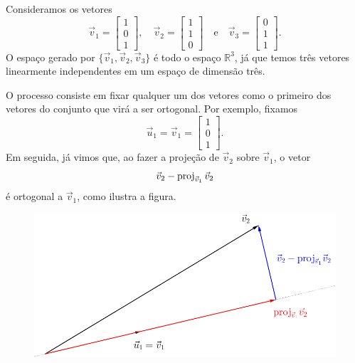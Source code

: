 \begin{ex}
Consideramos os vetores
\begin{equation}
\vec{v}_1 =
\begin{bmatrix}
1 \\ 0 \\ 1
\end{bmatrix}, \quad
\vec{v}_2 =
\begin{bmatrix}
1 \\ 1 \\ 0
\end{bmatrix} \quad \text{e} \quad
\vec{v}_3 =
\begin{bmatrix}
0 \\ 1 \\ 1
\end{bmatrix}.
\end{equation} O espaço gerado por $\{\vec{v}_1, \vec{v}_2, \vec{v}_3 \}$ é todo o espaço $\mathbb{R}^3$, já que temos três vetores  linearmente independentes em um espaço de dimensão três.

O processo consiste em fixar qualquer um dos vetores como o primeiro dos vetores do conjunto que virá a ser ortogonal. Por exemplo, fixamos
\begin{equation}
\vec{u}_1 = \vec{v}_1 =
\begin{bmatrix}
1 \\ 0 \\ 1
\end{bmatrix}.
\end{equation} Em seguida, já vimos que, ao fazer a projeção de $\vec{v}_2$ sobre $\vec{v}_1$, o vetor
\begin{equation}
\vec{v}_2 - \operatorname{proj}_{\vec{v}_1} \vec{v}_2
\end{equation} é ortogonal a $\vec{v}_1$, como ilustra a figura.
\begin{figure}[h!]
\begin{center}
\includegraphics[width=0.7\linewidth]{Semana12/semana12-gram1}
\end{center}
\end{figure}


\end{ex}
